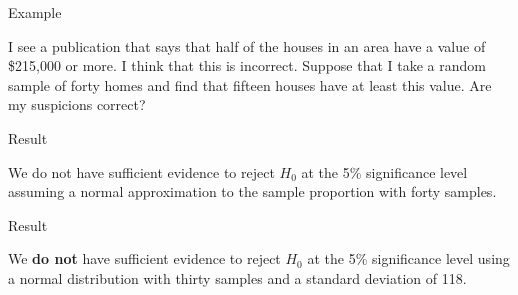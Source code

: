 \begin{frame}{Example}

  I see a publication that says that half of the houses in an area
  have a value of \$215,000 or more. I think that this is incorrect.
  Suppose that I take a random sample of forty homes and find that
  fifteen houses have at least this value. Are my suspicions correct?
  
  
\end{frame}


\begin{frame}{Result}

  We do not have sufficient evidence to reject $H_0$ at the 5\%
  significance level assuming a normal approximation to the sample
  proportion with forty samples.
  
\end{frame}



\begin{frame}{Result}

  We \textbf{do not} have sufficient evidence to reject $H_0$ at the
  5\% significance level using a normal distribution with thirty
  samples and a standard deviation of 118.
  
\end{frame}



